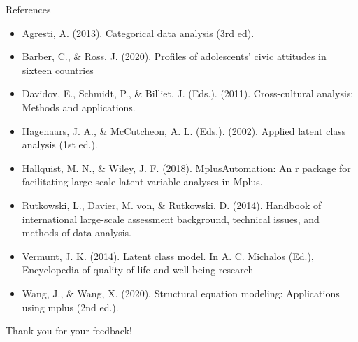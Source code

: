 \documentclass[11pt,t]{beamer}
\newcommand\Fontvi{\fontsize{8}{11}\selectfont}
\begin{document}
\begin{frame}{References}
\Fontvi
\begin{itemize}
\item Agresti, A. (2013). Categorical data analysis (3rd ed).\\

\item Barber, C., \& Ross, J. (2020). Profiles of adolescents’ civic attitudes in sixteen countries\\

\item Davidov, E., Schmidt, P., \& Billiet, J. (Eds.). (2011). Cross-cultural analysis: Methods and applications.\\

\item Hagenaars, J. A., \& McCutcheon, A. L. (Eds.). (2002). Applied latent class analysis (1st ed.). \\

\item Hallquist, M. N., \& Wiley, J. F. (2018). MplusAutomation: An r package for facilitating large-scale latent variable analyses in Mplus. \\

\item Rutkowski, L., Davier, M. von, \& Rutkowski, D. (2014). Handbook of international large-scale assessment background, technical issues, and methods of data analysis.\\

\item Vermunt, J. K. (2014). Latent class model. In A. C. Michalos (Ed.), Encyclopedia of quality of life and well-being research 

\item Wang, J., \& Wang, X. (2020). Structural equation modeling: Applications using mplus (2nd ed.). \\
\end{itemize}
\end{frame} 

\begin{frame}
	\vspace{15mm}
	\begin{center}
Thank you for your feedback!
\end{center}
\end{frame}
\end{document}
